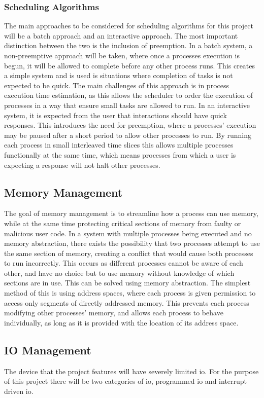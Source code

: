 \subsubsection{Scheduling Algorithms}
The main approaches to be considered for scheduling algorithms for this project will be a batch approach and an interactive approach. The most important distinction between the two is the inclusion of preemption. In a batch system, a non-preemptive approach will be taken, where once a processes execution is begun, it will be allowed to complete before any other process runs. This creates a simple system and is used is situations where completion of tasks is not expected to be quick. The main challenges of this approach is in process execution time estimation, as this allows the scheduler to order the execution of processes in a way that ensure small tasks are allowed to run. In an interactive system, it is expected from the user that interactions should have quick responses. This introduces the need for preemption, where a processes' execution may be paused after a short period to allow other processes to run. By running each process in small interleaved time slices this allows multiple processes functionally at the same time, which means processes from which a user is expecting a response will not halt other processes\cite{modern_operating}.
\subsection{Memory Management}
The goal of memory management is to streamline how a process can use memory, while at the same time protecting critical sections of memory from faulty or malicious user code. In a system with multiple processes being executed and no memory abstraction, there exists the possibility that two processes attempt to use the same section of memory, creating a conflict that would cause both processes to run incorrectly. This occurs as different processes cannot be aware of each other, and have no choice but to use memory without knowledge of which sections are in use. This can be solved using memory abstraction. The simplest method of this is using address spaces, where each process is given permission to access only segments of directly addressed memory. This prevents each process modifying other processes' memory, and allows each process to behave individually, as long as it is provided with the location of its address space\cite{modern_operating}.
\subsection{IO Management}
The device that the project features will have severely limited \ac{io}. For the purpose of this project there will be two categories of \ac{io}, programmed \ac{io} and interrupt driven \ac{io}. 
